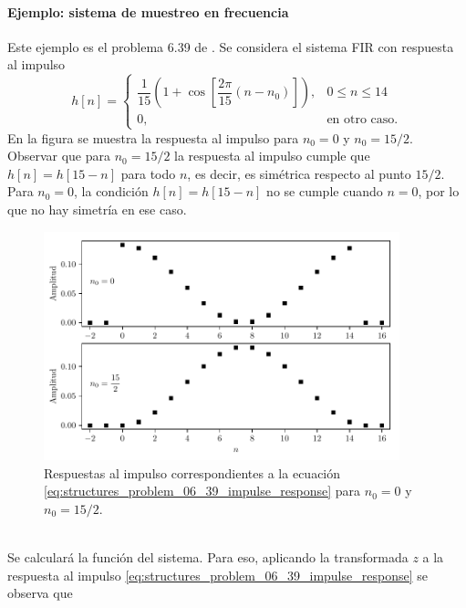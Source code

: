 \documentclass[a4paper]{report}
\begin{document}
\paragraph{Ejemplo: sistema de muestreo en frecuencia} Este ejemplo es el problema 6.39 de \cite{oppenheim2009discrete}. Se considera el sistema FIR con respuesta al impulso
\begin{equation}\label{eq:structures_problem_06_39_impulse_response}
 h[n]=
 \left\{ 
 \begin{array}{ll}
  \dfrac{1}{15}\left(1+\cos\left[\dfrac{2\pi}{15}(n-n_0)\right]\right), & 0\leq n\leq 14\\
  0, & \textrm{en otro caso}.
 \end{array}
 \right. 
\end{equation}
En la figura se muestra la respuesta al impulso para \(n_0=0\) y \(n_0=15/2\). Observar que para \(n_0=15/2\) la respuesta al impulso cumple que \(h[n]=h[15-n]\) para todo \(n\), es decir, es simétrica respecto al punto \(15/2\). Para \(n_0=0\), la condición \(h[n]=h[15-n]\) no se cumple cuando \(n=0\), por lo que no hay simetría en ese caso.
\begin{figure}[!htb]
 \begin{center}
 \includegraphics[width=0.92\textwidth]{figuras/structures_problem_06_39_impulse_response.pdf}
 \caption{\label{fig:structures_problem_06_39_impulse_response} Respuestas al impulso correspondientes a la ecuación \ref{eq:structures_problem_06_39_impulse_response} para \(n_0=0\) y \(n_0=15/2\).}
 \end{center}
\end{figure}
\\
Se calculará la función del sistema. Para eso, aplicando la transformada \(z\) a la respuesta al impulso \ref{eq:structures_problem_06_39_impulse_response} se observa que 
\end{document}
